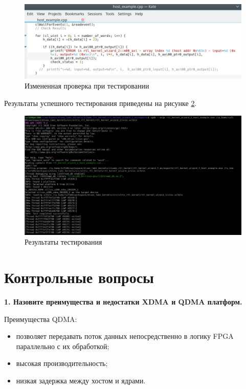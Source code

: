 \begin{figure}[H]
	\begin{center}
		\includegraphics[scale=0.4]{img/host_example.png}
	\end{center}
	\captionsetup{justification=centering}
	\caption{Измененная проверка при тестировании}
	\label{img:host_example}
\end{figure}

Результаты успешного тестирования приведены на рисунке \ref{img:test}.

\begin{figure}[H]
	\begin{center}
		\includegraphics[scale=0.2]{img/test.png}
	\end{center}
	\captionsetup{justification=centering}
	\caption{ Результаты тестирования}
	\label{img:test}
\end{figure}

\chapter{Контрольные вопросы}

\textbf{1. Назовите преимущества и недостатки XDMA и QDMA платформ.}

Преимущества QDMA:
\begin{itemize}
	\item позволяет передавать поток данных непосредственно в логику FPGA параллельно с их обработкой;
	\item высокая производительность;
	\item низкая задержка между хостом и ядрами.
\end{itemize}


